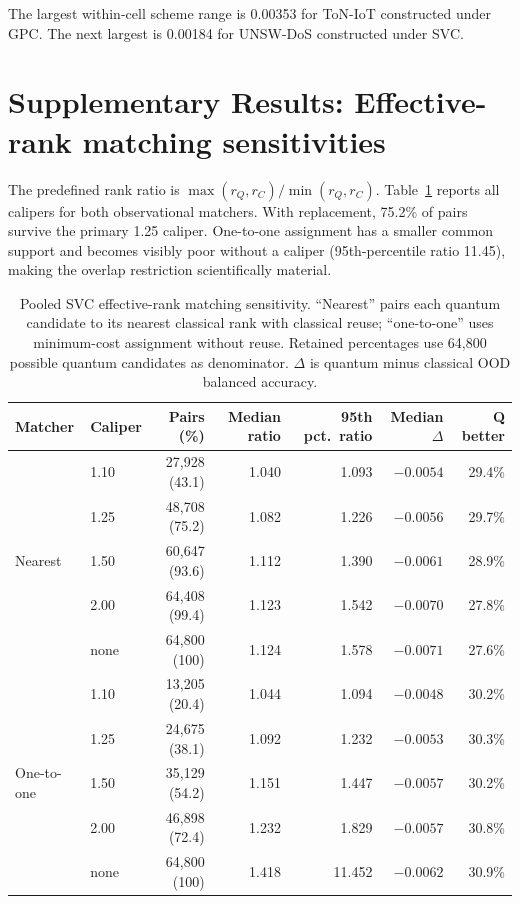 \documentclass[11pt]{article}
\begin{document}
The largest within-cell scheme range is 0.00353 for ToN-IoT constructed
under GPC. The next largest is 0.00184 for UNSW-DoS constructed under SVC.

\section*{Supplementary Results: Effective-rank matching sensitivities}
\label{supp:rank}

The predefined rank ratio is
$\max(r_Q,r_C)/\min(r_Q,r_C)$. Table~\ref{supp:tab_rank} reports all
calipers for both observational matchers. With replacement, 75.2\% of pairs
survive the primary 1.25 caliper. One-to-one assignment has a smaller common
support and becomes visibly poor without a caliper (95th-percentile ratio
11.45), making the overlap restriction scientifically material.

\begin{table}[ht]
\centering
\caption{Pooled SVC effective-rank matching sensitivity. ``Nearest'' pairs
each quantum candidate to its nearest classical rank with classical reuse;
``one-to-one'' uses minimum-cost assignment without reuse. Retained
percentages use 64,800 possible quantum candidates as denominator.
$\Delta$ is quantum minus classical OOD balanced accuracy.}
\label{supp:tab_rank}
\scriptsize
\setlength{\tabcolsep}{3.5pt}
\begin{tabular}{llrrrrr}
\toprule
Matcher & Caliper & Pairs (\%) & Median ratio & 95th pct.\ ratio &
Median $\Delta$ & Q better \\
\midrule
\multirow{5}{*}{Nearest}
 & 1.10 & 27,928 (43.1) & 1.040 & 1.093 & $-0.0054$ & 29.4\% \\
 & 1.25 & 48,708 (75.2) & 1.082 & 1.226 & $-0.0056$ & 29.7\% \\
 & 1.50 & 60,647 (93.6) & 1.112 & 1.390 & $-0.0061$ & 28.9\% \\
 & 2.00 & 64,408 (99.4) & 1.123 & 1.542 & $-0.0070$ & 27.8\% \\
 & none & 64,800 (100) & 1.124 & 1.578 & $-0.0071$ & 27.6\% \\
\midrule
\multirow{5}{*}{One-to-one}
 & 1.10 & 13,205 (20.4) & 1.044 & 1.094 & $-0.0048$ & 30.2\% \\
 & 1.25 & 24,675 (38.1) & 1.092 & 1.232 & $-0.0053$ & 30.3\% \\
 & 1.50 & 35,129 (54.2) & 1.151 & 1.447 & $-0.0057$ & 30.2\% \\
 & 2.00 & 46,898 (72.4) & 1.232 & 1.829 & $-0.0057$ & 30.8\% \\
 & none & 64,800 (100) & 1.418 & 11.452 & $-0.0062$ & 30.9\% \\
\bottomrule
\end{tabular}
\end{table}
\end{document}
